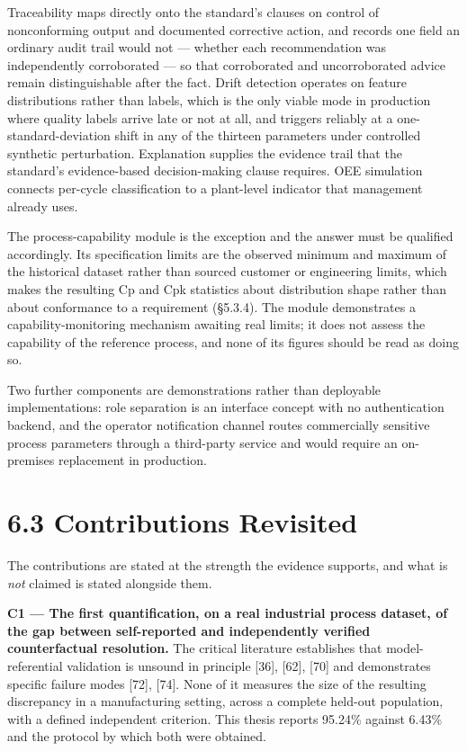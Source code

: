 Traceability maps directly onto the standard's clauses on control of nonconforming output and documented corrective action, and records one field an ordinary audit trail would not --- whether each recommendation was independently corroborated --- so that corroborated and uncorroborated advice remain distinguishable after the fact. Drift detection operates on feature distributions rather than labels, which is the only viable mode in production where quality labels arrive late or not at all, and triggers reliably at a one-standard-deviation shift in any of the thirteen parameters under controlled synthetic perturbation. Explanation supplies the evidence trail that the standard's evidence-based decision-making clause requires. OEE simulation connects per-cycle classification to a plant-level indicator that management already uses.

The process-capability module is the exception and the answer must be qualified accordingly. Its specification limits are the observed minimum and maximum of the historical dataset rather than sourced customer or engineering limits, which makes the resulting Cp and Cpk statistics about distribution shape rather than about conformance to a requirement (§5.3.4). The module demonstrates a capability-monitoring mechanism awaiting real limits; it does not assess the capability of the reference process, and none of its figures should be read as doing so.

Two further components are demonstrations rather than deployable implementations: role separation is an interface concept with no authentication backend, and the operator notification channel routes commercially sensitive process parameters through a third-party service and would require an on-premises replacement in production.

\hypertarget{contributions-revisited}{%
\section{6.3 Contributions Revisited}\label{contributions-revisited}}

The contributions are stated at the strength the evidence supports, and what is \emph{not} claimed is stated alongside them.

\textbf{C1 --- The first quantification, on a real industrial process dataset, of the gap between self-reported and independently verified counterfactual resolution.} The critical literature establishes that model-referential validation is unsound in principle {[}36{]}, {[}62{]}, {[}70{]} and demonstrates specific failure modes {[}72{]}, {[}74{]}. None of it measures the size of the resulting discrepancy in a manufacturing setting, across a complete held-out population, with a defined independent criterion. This thesis reports 95.24\% against 6.43\% and the protocol by which both were obtained.

